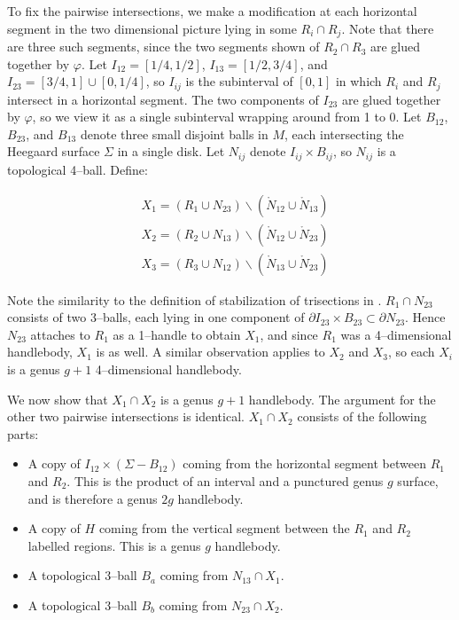 \documentclass[12pt]{amsart}
\newcommand{\del}{\partial }
\theoremstyle{definition}
\theoremstyle{remark}
\begin{document}
To fix the pairwise intersections, we make a modification at each horizontal segment in the two dimensional picture lying in some $R_i \cap R_j$.  Note that there are three such segments, since the two segments shown of $R_2 \cap R_3$ are glued together by $\varphi$.   Let $I_{12} = [1/4,1/2]$, $I_{13} = [1/2,3/4]$, and $I_{23} = [3/4,1] \cup [0,1/4]$, so $I_{ij}$ is the subinterval of $[0,1]$ in which $R_i$ and $R_j$ intersect in a horizontal segment.  The two components of $I_{23}$ are glued together by $\varphi$, so we view it as a single subinterval wrapping around from 1 to 0.  Let $B_{12}$, $B_{23}$, and $B_{13}$ denote three small disjoint balls in $M$, each intersecting the Heegaard surface $\Sigma$ in a single disk.  Let $N_{ij}$ denote $I_{ij} \times B_{ij}$, so $N_{ij}$ is a topological 4--ball.  Define:

\begin{align*}
&X_1 = (R_1 \cup N_{23}) \backslash (\mathring N_{12} \cup \mathring N_{13}) \\
&X_2 = (R_2 \cup N_{13}) \backslash (\mathring N_{12} \cup \mathring N_{23}) \\
&X_3 = (R_3 \cup N_{12}) \backslash (\mathring N_{13} \cup \mathring N_{23}) 
\end{align*}

Note the similarity to the definition of stabilization of trisections in \cite{GayKirby1}.  $R_1 \cap N_{23}$ consists of two 3--balls, each lying in one component of $\del I_{23} \times B_{23} \subset \del N_{23}$.  Hence $N_{23}$ attaches to $R_1$ as a 1--handle to obtain $X_1$, and since $R_1$ was a 4--dimensional handlebody, $X_1$ is as well.  A similar observation applies to $X_2$ and $X_3$, so each $X_i$ is a genus $g+1$ 4--dimensional handlebody.

We now show that $X_1 \cap X_2$ is a genus $g+1$ handlebody.  The argument for the other two pairwise intersections is identical.  $X_1 \cap X_2$ consists of the following parts:

\begin{itemize}
\item A copy of $I_{12} \times (\Sigma - B_{12})$ coming from the horizontal segment between $R_1$ and $R_2$.  This is the product of an interval and a punctured genus $g$ surface, and is therefore a genus $2g$ handlebody.  
\item A copy of $H$ coming from the vertical segment between the $R_1$ and $R_2$ labelled regions.  This is a genus $g$ handlebody.
\item A topological 3--ball $B_a$ coming from $N_{13} \cap X_1$.
\item A topological 3--ball $B_b$ coming from $N_{23} \cap X_2$.
\end{itemize}
\end{document}
